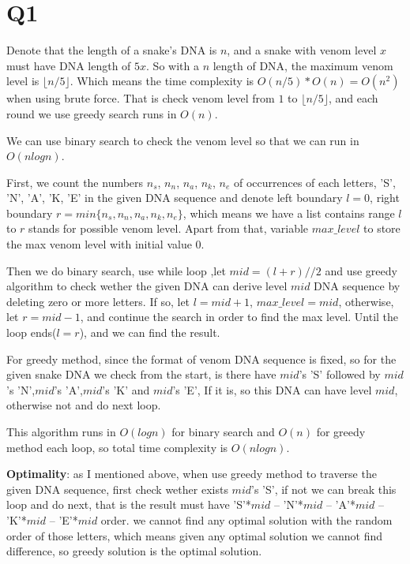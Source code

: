 \documentclass[a4paper]{article}
\begin{document}
	\section*{Q1}
	Denote that the length of a snake's DNA is $n$, and a snake with venom level $x$ must have DNA length of $5x$. So with a $n$ length of DNA, the maximum venom level is $\lfloor n/5 \rfloor$. Which means the time complexity is $O(n/5) * O(n) = O(n^2)$ when using brute force. That is check venom level from $1$ to $\lfloor n/5 \rfloor$, and each round we use greedy search runs in $O(n)$.
	
	We can use binary search to check the venom level so that we can run in $O(nlog n)$.
	
	First, we count the numbers $n_s$, $n_n$, $n_a$, $n_k$, $n_e$ of occurrences of each letters, 'S', 'N', 'A', 'K, 'E' in the given DNA sequence and denote left boundary $l=0$, right boundary $r=min\{n_s, n_n, n_a, n_k, n_e\}$, which means we have a list contains range $l$ to $r$ stands for possible venom level. Apart from that, variable $max\_level$ to store the max venom level with initial value $0$.
	
	Then we do binary search, use while loop ,let $mid = (l + r) // 2$ and use greedy algorithm to check wether the given DNA can derive level $mid$ DNA sequence by deleting zero or more letters. If so, let $l = mid + 1$, $max\_level=mid$, otherwise, let $r = mid - 1$, and continue the search in order to find the max level. Until the loop ends($l=r$), and we can find the result.
	
	For greedy method, since the format of venom DNA sequence is fixed, so for the given snake DNA we check from the start, is there have $mid$'s 'S' followed by $mid$'s 'N',$mid$'s 'A',$mid$'s 'K' and $mid$'s 'E', If it is, so this DNA can have level $mid$, otherwise not and do next loop.
	
	This algorithm runs in $O(log n)$ for binary search and $O(n)$ for greedy method each loop, so total time complexity is $O(nlog n)$.
	
	\textbf{Optimality}: as I mentioned above, when use greedy method to traverse the given DNA sequence, first check wether exists $mid$'s 'S', if not we can break this loop and do next, that is  the result must have 'S'*$mid$ -- 'N'*$mid$ -- 'A'*$mid$ -- 'K'*$mid$ -- 'E'*$mid$ order. we cannot find any optimal solution with the random order of those letters, which means given any  optimal solution we cannot find difference, so greedy solution is the optimal solution.  
	
\end{document}
